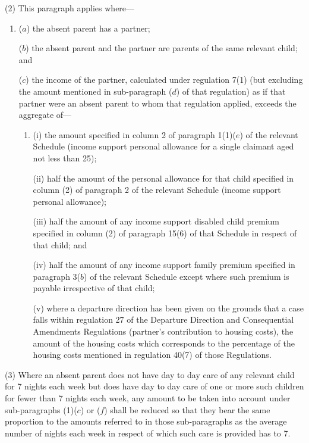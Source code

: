 \documentclass[a4paper]{article}
\begin{document}
(2) This paragraph applies where—
\begin{enumerate}\item[]
($a$) the absent parent has a partner;

($b$) the absent parent and the partner are parents of the same relevant child; and

($c$) the income of the partner, calculated under regulation 7(1) 
(but excluding the amount mentioned in sub-paragraph ($d$) of that regulation) %
as if that partner were an absent parent to whom that regulation applied, exceeds the aggregate of—
\begin{enumerate}\item[]
(i) the amount specified in column 2 of paragraph 1(1)($e$) of the relevant Schedule (income support personal allowance for a single claimant aged not less than 25);

(ii) half the amount of the personal allowance for that child specified in column (2) of paragraph 2 of the relevant Schedule (income support personal allowance);

(iii) half the amount of any income support disabled child premium specified in column (2) of paragraph 15(6) of that Schedule in respect of that child;
and %

(iv) half the amount of any income support family premium specified in paragraph 
3($b$) of the relevant Schedule  %
except where such premium is payable irrespective of that child;%

(v) where a departure direction has been given on the grounds that a case falls
within regulation 27 of the Departure Direction and Consequential Amendments
Regulations (partner’s contribution to housing costs), the amount of the housing
costs which corresponds to the percentage of the housing costs mentioned in
regulation 40(7) of those Regulations.
\end{enumerate}
\end{enumerate}

(3) Where an absent parent does not have day to day care of any relevant child for 7 nights each week but does have day to day care of one or more such children for fewer than 7 nights each week, 
any amount  %
to be taken into account under sub-paragraphs (1)($c$) 
or ($f$)  %
shall be reduced so that they bear the same proportion to the amounts referred to in those sub-paragraphs as the average number of nights each week in respect of which such care is provided has to 7.
\end{document}
